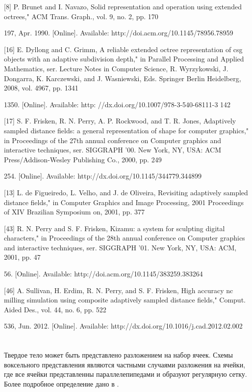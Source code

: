 [8] P. Brunet and I. Navazo, Solid representation and operation using extended
octrees," ACM Trans. Graph., vol. 9, no. 2, pp. 170{197, Apr. 1990. [Online].
Available: http://doi.acm.org/10.1145/78956.78959

[16] E. Dyllong and C. Grimm, A reliable extended octree representation of
csg objects with an adaptive subdivision depth," in Parallel Processing and
Applied Mathematics, ser. Lecture Notes in Computer Science, R. Wyrzykowski,
J. Dongarra, K. Karczewski, and J. Wasniewski, Eds. Springer Berlin
Heidelberg, 2008, vol. 4967, pp. 1341{1350. [Online]. Available: http:
//dx.doi.org/10.1007/978-3-540-68111-3 142

[17] S. F. Frisken, R. N. Perry, A. P. Rockwood, and T. R. Jones, Adaptively
sampled distance fields: a general representation of shape for computer
graphics," in Proceedings of the 27th annual conference on Computer graphics
and interactive techniques, ser. SIGGRAPH ’00. New York, NY, USA: ACM
Press/Addison-Wesley Publishing Co., 2000, pp. 249{254. [Online]. Available:
http://dx.doi.org/10.1145/344779.344899

[13] L. de Figueiredo, L. Velho, and J. de Oliveira, Revisiting adaptively sampled
distance fields," in Computer Graphics and Image Processing, 2001 Proceedings
of XIV Brazilian Symposium on, 2001, pp. 377

[43] R. N. Perry and S. F. Frisken, Kizamu: a system for sculpting digital
characters," in Proceedings of the 28th annual conference on Computer graphics
and interactive techniques, ser. SIGGRAPH ’01. New York, NY, USA: ACM,
2001, pp. 47{56. [Online]. Available: http://doi.acm.org/10.1145/383259.383264

[46] A. Sullivan, H. Erdim, R. N. Perry, and S. F. Frisken, High accuracy
nc milling simulation using composite adaptively sampled distance fields,"
Comput. Aided Des., vol. 44, no. 6, pp. 522{536, Jun. 2012. [Online]. Available:
http://dx.doi.org/10.1016/j.cad.2012.02.002



\section{} \label{sect_cell_decompositions}

Твердое тело может быть представлено разложением на набор ячеек. Схемы воксельного представления являются частными случаями разложения на ячейки, где все ячейки представленны параллелепипедами и образуют регулярную сетку. Более подробное определение дано в \cite{Requicha80}.

}}}}}
